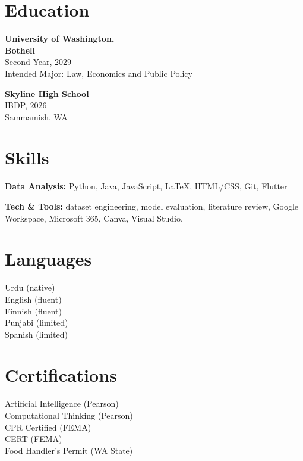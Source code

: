 \documentclass[11pt,a4paper,sans]{moderncv}
\begin{document}
\makecvtitle
\vspace{-5mm}


\begin{minipage}[t]{0.28\textwidth}

\section{Education}

\textbf{University of Washington,} \\
\textbf{Bothell} \\
Second Year, 2029 \\
Intended Major: Law, Economics and Public Policy\\
\vspace{2mm}

\textbf{Skyline High School} \\
IBDP, 2026 \\
Sammamish, WA
\vspace{2mm}

\section{Skills}
\textbf{Data Analysis:} Python, Java, JavaScript, LaTeX, HTML/CSS, Git, Flutter\\
\vspace{2mm}

\textbf{Tech \& Tools:} dataset engineering, model evaluation, literature review, Google Workspace, Microsoft 365, Canva, Visual Studio.
\vspace{2mm}

\section{Languages}
Urdu (native) \\
English (fluent) \\
Finnish (fluent) \\
Punjabi (limited) \\
Spanish (limited)
\vspace{2mm}

\section{Certifications}
Artificial Intelligence (Pearson) \\
Computational Thinking (Pearson) \\
CPR Certified (FEMA) \\
CERT (FEMA) \\
Food Handler's Permit (WA State)
\vspace{2mm}

\end{minipage}
\end{document}

